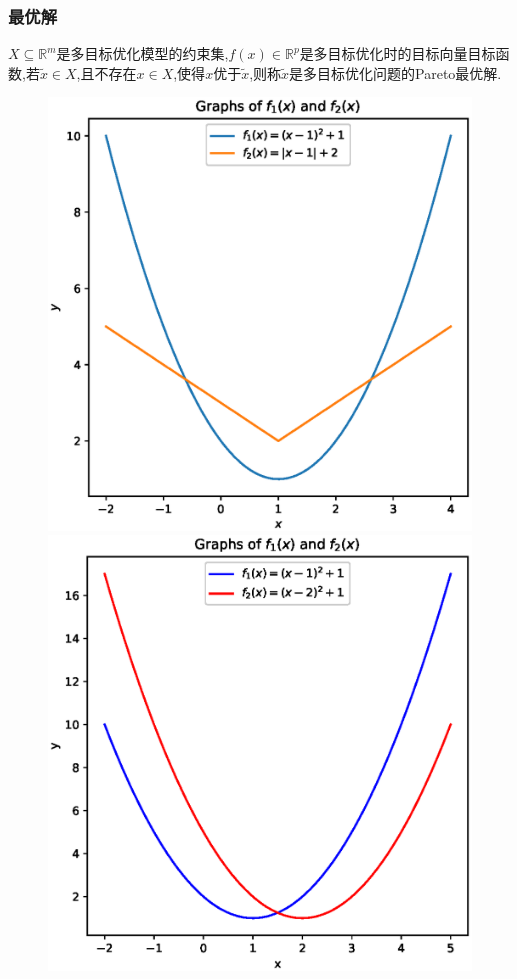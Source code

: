 \documentclass{beamer}
\begin{document}
	\begin{frame}
		\frametitle{最优解}
		\begin{definition}[Pareto最优解]
			$X\subseteq \mathbb{R}^m $是多目标优化模型的约束集,$f(x)\in \mathbb{R}^p $是多目标优化时的目标向量目标函数,若$\widetilde{x}\in X$,且不存在$x\in X$,使得$x$优于$\widetilde{x}$,则称$\widetilde{x}$是多目标优化问题的Pareto最优解.
		\end{definition}
	\begin{figure}[ht]
		\centering
		\includegraphics[scale=0.3]{figure1.eps}
		\hspace{1in}
		\includegraphics[scale=0.3]{figure2.eps}
	\end{figure}
		
	
	\end{frame}
\end{document}
